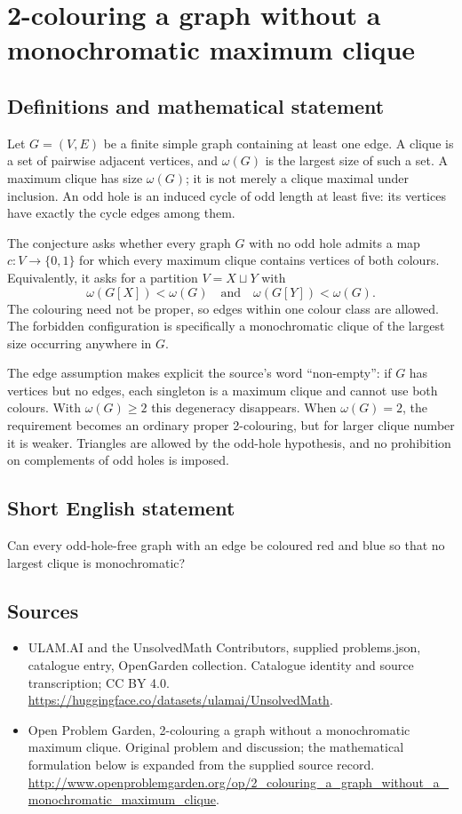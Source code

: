 \documentclass[11pt,a4paper]{article}
\begin{document}
\section*{2-colouring a graph without a monochromatic maximum clique}\label{statement}

\subsection{Definitions and mathematical statement}
Let $G=(V,E)$ be a finite simple graph containing at least one edge. A
clique is a set of pairwise adjacent vertices, and $\omega(G)$ is the
largest size of such a set. A maximum clique has size $\omega(G)$; it is
not merely a clique maximal under inclusion. An odd hole is an induced
cycle of odd length at least five: its vertices have exactly the cycle
edges among them.

The conjecture asks whether every graph $G$ with no odd hole admits a
map $c:V\to\{0,1\}$ for which every maximum clique contains vertices of
both colours. Equivalently, it asks for a partition $V=X\sqcup Y$ with
\[
                 \omega(G[X])<\omega(G)
                 \quad\text{and}\quad
                 \omega(G[Y])<\omega(G).
\]
The colouring need not be proper, so edges within one colour class are
allowed. The forbidden configuration is specifically a monochromatic
clique of the largest size occurring anywhere in $G$.

The edge assumption makes explicit the source's word ``non-empty'': if
$G$ has vertices but no edges, each singleton is a maximum clique and
cannot use both colours. With $\omega(G)\ge2$ this degeneracy disappears.
When $\omega(G)=2$, the requirement becomes an ordinary proper
2-colouring, but for larger clique number it is weaker. Triangles are
allowed by the odd-hole hypothesis, and no prohibition on complements
of odd holes is imposed.
\subsection{Short English statement}
Can every odd-hole-free graph with an edge be coloured red and blue so that no largest clique is monochromatic?
\subsection{Sources}
\begin{itemize}
\item[S1] ULAM.AI and the UnsolvedMath Contributors, supplied problems.json, catalogue entry, OpenGarden collection. Catalogue identity and source transcription; CC BY 4.0.
\url{https://huggingface.co/datasets/ulamai/UnsolvedMath}.
\item[S2] Open Problem Garden, 2-colouring a graph without a monochromatic maximum clique. Original problem and discussion; the mathematical formulation below is expanded from the supplied source record.
\url{http://www.openproblemgarden.org/op/2_colouring_a_graph_without_a_monochromatic_maximum_clique}.
\end{itemize}
\end{document}
